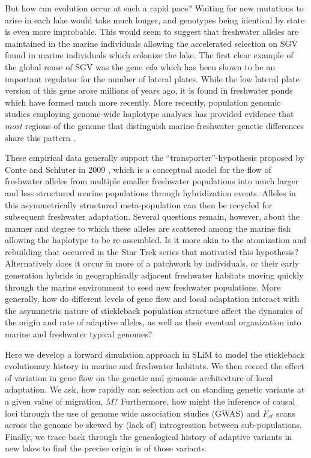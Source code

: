\documentclass{article}
\begin{document}
But how can evolution occur at such a rapid pace? 
Waiting for new mutations to arise in each lake would take much longer, and genotypes being identical by state is even more improbable. 
This would seem to suggest that freshwater alleles are maintained in the marine individuals allowing the accelerated selection on SGV found in marine individuals which colonize the lake. 
The first clear example of the global reuse of SGV was the gene \textit{eda} which has been shown to be an important regulator for the number of lateral plates. 
While the low lateral plate version of this gene arose millions of years ago, it is found in freshwater ponds which have formed much more recently. 
More recently, population genomic studies employing genome-wide haplotype analyses has provided evidence that \textit{most} regions of the genome that distinguish marine-freshwater genetic differences share this pattern \citep{nelson2017ancient}. 
 
These empirical data generally support the ``transporter''-hypothesis proposed by Conte and Schluter in 2009 \citet{schluter2009genetics}, 
which is a conceptual model for the flow of freshwater alleles from multiple smaller freshwater populations into much larger and less structured marine populations through hybridization events. 
Alleles in this asymmetrically structured meta-population can then be recycled for subsequent freshwater adaptation. 
Several questions remain, however, about the manner and degree to which these alleles are scattered among the marine fish allowing the haplotype to be re-assembled. 
Is it more akin to the atomization and rebuilding that occurred in the Star Trek series that motivated this hypothesis? 
Alternatively does it occur in more of a patchwork by individuals, 
or their early generation hybrids in geographically adjacent freshwater habitats moving quickly through the marine environment to seed new freshwater populations. 
More generally, how do different levels of gene flow and local adaptation interact with the asymmetric nature of stickleback population structure affect the dynamics of the origin and rate of adaptive alleles, 
as well as their eventual organization into marine and freshwater typical genomes? 

Here we develop a forward simulation approach in SLiM to model the stickleback evolutionary history in marine and freshwater habitats.
We then record the effect of variation in gene flow on the genetic and genomic architecture of local adaptation.
We ask, how rapidly can selection act on standing genetic variants at a given value of migration, $M$?
Furthermore, how might the inference of causal loci through the use of genome wide association studies (GWAS) and $F_{st}$ scans across the genome be skewed by (lack of) introgression between sub-populations. 
Finally, we trace back through the genealogical history of adaptive variants in new lakes to find the precise origin is of those variants.
\end{document}
